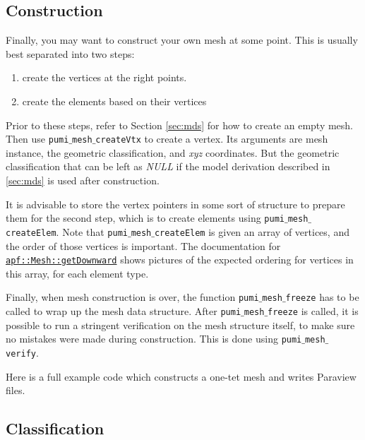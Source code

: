 \documentclass{article}
\begin{document}
{

\subsection{Construction}
\label{sec:gen}

Finally, you may want to construct your own mesh at
some point.
This is usually best separated into two steps:
\begin{enumerate}
\item create the vertices at the right points.
\item create the elements based on their vertices
\end{enumerate}

Prior to these steps, refer to Section \ref{sec:mds} for
how to create an empty mesh.
Then use \texttt{pumi$\_$mesh$\_$createVtx} to create a vertex.
Its arguments are mesh instance, the geometric classification, and \emph{xyz} coordinates. But the geometric classification that can be left as \emph{NULL} if the model derivation described
in \ref{sec:mds} is used after construction.

It is advisable to store the vertex pointers in some sort
of structure to prepare them for the second step,
which is to create elements using \texttt{pumi$\_$mesh$\_$createElem}.
Note that \texttt{pumi$\_$mesh$\_$createElem} is given an array
of vertices, and the order of those vertices is important.
The documentation for
\href{http://scorec.rpi.edu/~dibanez/core/classapf_1_1Mesh.html#ae9af2075129ffd4553092049d85b276b}{\texttt{apf::Mesh::getDownward}}
shows pictures of the expected ordering for vertices
in this array, for each element type.

Finally, when mesh construction is over, the function \texttt{pumi$\_$mesh$\_$freeze} has to be called 
to wrap up the mesh data structure.
After \texttt{pumi$\_$mesh$\_$freeze} is called, it is possible to run
a stringent verification on the mesh structure itself,
to make sure no mistakes were made during construction.
This is done using \texttt{pumi$\_$mesh$\_$verify}.

Here is a full example code which constructs a one-tet
mesh and writes Paraview files.



\subsection{Classification}

}
\end{document}
